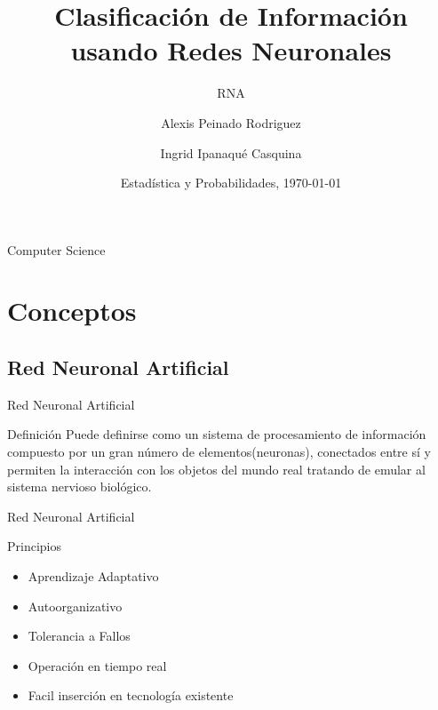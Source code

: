\documentclass{beamer}
\title{Clasificación de Información usando Redes Neuronales}
\subtitle{RNA}
\author{Alexis Peinado Rodriguez \and Ingrid Ipanaqué Casquina}
\institute[Universidad Nacional De Ingenieria]
{
  Ciencia de la Computación\\
  Universidad Nacional de Ingeniería
}
\date{Estadística y Probabilidades, \today}
\begin{document}
\begin{frame}
  \titlepage
\end{frame}

\begin{frame}{Computer Science}
  \tableofcontents
\end{frame}

\section{Conceptos}

\subsection{Red Neuronal Artificial}

\begin{frame}{Red Neuronal Artificial}
\begin{block}{Definición}
Puede definirse como un sistema de procesamiento de información compuesto por un gran número de elementos(neuronas), conectados entre sí y permiten la interacción
con los objetos del mundo real tratando de emular al sistema nervioso biológico.
\end{block}
\end{frame}

\begin{frame}{Red Neuronal Artificial}
\begin{block}{Principios}
\begin{itemize}
\item {Aprendizaje Adaptativo\pause}
\item {Autoorganizativo\pause}
\item {Tolerancia a Fallos\pause}
\item {Operación en tiempo real\pause}
\item {Facil inserción en tecnología existente}
\end{itemize}
\end{block}
\end{frame}
\end{document}
